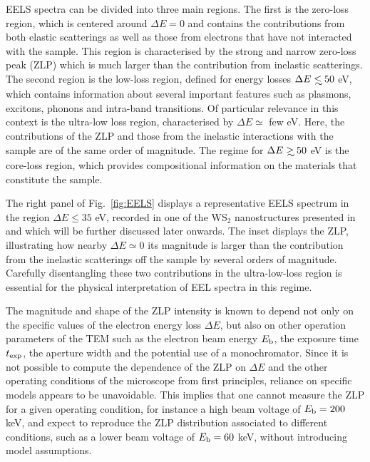 EELS spectra can be divided into three main regions.
%
The first is the zero-loss region, which is centered around $\Delta E=0$
and contains the contributions from both elastic scatterings
as well as those from electrons that have not interacted with the
sample.
%
This region is characterised by the strong and narrow zero-loss peak (ZLP)
which is much larger than the contribution
from inelastic scatterings.
%
The second region is the low-loss region, defined for energy losses
$\Delta E \lsim 50$ eV, which contains information
about several important features such as plasmons, excitons, phonons and
intra-band transitions.
%
Of particular relevance in this context is the ultra-low loss region, characterised by $\Delta E \simeq$ few eV.
Here, the contributions of the ZLP and those from the inelastic interactions
with the sample are of the same order of magnitude.
%
The regime for $\Delta E \gsim 50$ eV is the core-loss region,
which provides compositional information
on the materials that constitute the sample.
 
The right panel of Fig.~\ref{fig:EELS} displays
a representative EELS spectrum in the region $\Delta E \le 35$ eV, recorded
in one of the WS$_2$ nanostructures presented in~\cite{SabryaWS2}
and which will be further discussed later onwards.
%
The inset displays the ZLP, illustrating how nearby $\Delta E\simeq 0$
its magnitude is larger than the contribution from the inelastic scatterings
off the sample by several
orders of magnitude.
%
Carefully disentangling these two contributions in the ultra-low-loss region
is essential for the physical interpretation of EEL spectra in this regime.

The magnitude and shape of the ZLP intensity is known to depend not only on the specific values
of the electron energy loss $\Delta E$, but also on other operation parameters
of the TEM such as the electron beam energy $E_{\rm b}$, the exposure time
$t_{\rm exp}$, the aperture width and the potential use of a monochromator.
%
Since it is not possible to compute the dependence of the ZLP on $\Delta E$
and the other operating conditions of the microscope from first principles,
reliance on specific models appears to be unavoidable.
%
This implies that one cannot measure the ZLP for a given operating
condition, for instance a high beam voltage of $E_{\rm b}=200$ keV, and expect to reproduce
the ZLP distribution
associated to different conditions, such as a lower beam voltage of $E_{\rm b}=60$ keV,
without introducing model assumptions.

